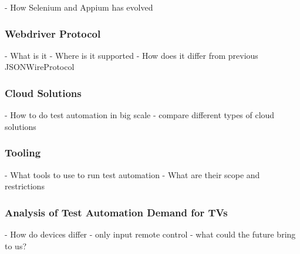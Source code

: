 - How Selenium and Appium has evolved

\subsubsection{Webdriver Protocol\label{sec:webdriver}}

- What is it
- Where is it supported
- How does it differ from previous JSONWireProtocol

\subsubsection{Cloud Solutions\label{sec:cloud}}

- How to do test automation in big scale
- compare different types of cloud solutions

\subsubsection{Tooling\label{sec:tooling}}

- What tools to use to run test automation
- What are their scope and restrictions

\subsubsection{Analysis of Test Automation Demand for TVs\label{sec:testautomationontv}}

- How do devices differ
- only input remote control
- what could the future bring to us?

